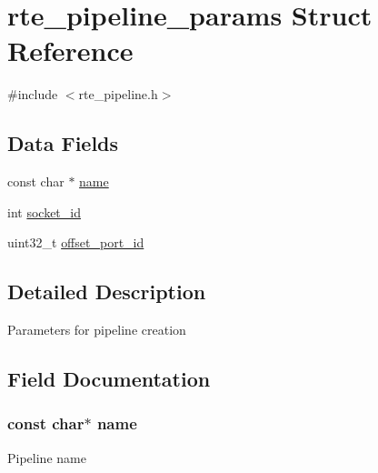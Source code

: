 \hypertarget{structrte__pipeline__params}{}\section{rte\+\_\+pipeline\+\_\+params Struct Reference}
\label{structrte__pipeline__params}


{\ttfamily \#include $<$rte\+\_\+pipeline.\+h$>$}

\subsection*{Data Fields}
\begin{DoxyCompactItemize}
\item 
const char $\ast$ \hyperlink{structrte__pipeline__params_a8f8f80d37794cde9472343e4487ba3eb}{name}
\item 
int \hyperlink{structrte__pipeline__params_a229cb0bd24215f0cb940e0724dbd4d55}{socket\+\_\+id}
\item 
uint32\+\_\+t \hyperlink{structrte__pipeline__params_a25c4a20cf2bedc19add239e11f1f461f}{offset\+\_\+port\+\_\+id}
\end{DoxyCompactItemize}


\subsection{Detailed Description}
Parameters for pipeline creation 

\subsection{Field Documentation}
\hypertarget{structrte__pipeline__params_a8f8f80d37794cde9472343e4487ba3eb}{}
\subsubsection[{name}]{\setlength{\rightskip}{0pt plus 5cm}const char$\ast$ name}\label{structrte__pipeline__params_a8f8f80d37794cde9472343e4487ba3eb}
Pipeline name \hypertarget{structrte__pipeline__params_a25c4a20cf2bedc19add239e11f1f461f}{}
